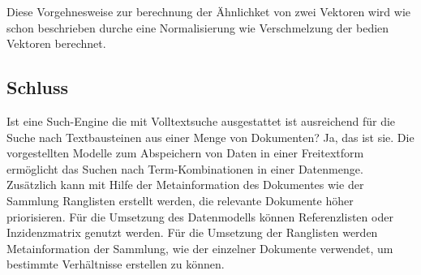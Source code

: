 Diese Vorgehnesweise zur berechnung der Ähnlichket von zwei Vektoren
wird wie schon beschrieben durche eine Normalisierung wie Verschmelzung
der bedien Vektoren berechnet.
\newline
\begin{figure}[h]
\centering
{}
\end{figure}

\subsection[Schluss]{Schluss}
Ist eine Such-Engine die mit Volltextsuche ausgestattet ist ausreichend
für die Suche nach Textbausteinen aus einer Menge von Dokumenten? Ja,
das ist sie. Die vorgestellten Modelle zum Abspeichern von Daten in
einer Freitextform ermöglicht das Suchen nach Term-Kombinationen in
einer Datenmenge. Zusätzlich kann mit Hilfe der Metainformation des
Dokumentes wie der Sammlung Ranglisten erstellt werden, die relevante
Dokumente höher priorisieren. 
\newline
Für die Umsetzung des Datenmodells können Referenzlisten oder
Inzidenzmatrix genutzt werden.  
\newline
Für die Umsetzung der Ranglisten werden Metainformation der Sammlung,
wie der einzelner Dokumente verwendet, um bestimmte Verhältnisse
erstellen zu können.

